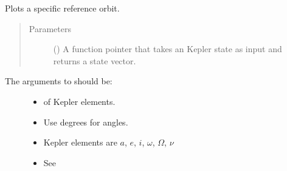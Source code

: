\documentclass[letterpaper,10pt,english]{sphinxmanual}
\begin{document}
\begin{fulllineitems}
\label{\detokenize{modules/dpt_tools:dpt_tools.plot_ref_orbit}}
Plots a specific reference orbit.
\begin{quote}\begin{description}
\item[{Parameters}] \leavevmode
{} () \textendash{} A function pointer that takes an Kepler state as input and returns a state vector.

\end{description}\end{quote}
\begin{description}
\item[{The arguments to  should be:}] \leavevmode\begin{itemize}
\item {} 
 of Kepler elements.

\item {} 
Use degrees for angles.

\item {} 
Kepler elements are \(a\), \(e\), \(i\), \(\omega\), \(\Omega\), \(\nu\)

\item {} 
See {\hyperref[\detokenize{modules/dpt_tools:dpt_tools.kep2cart}]{}}

\end{itemize}

\end{description}


%
\begin{sphinxVerbatim}[commandchars=\\\{\}]
   
   


\end{sphinxVerbatim}
\end{fulllineitems}
\end{document}
